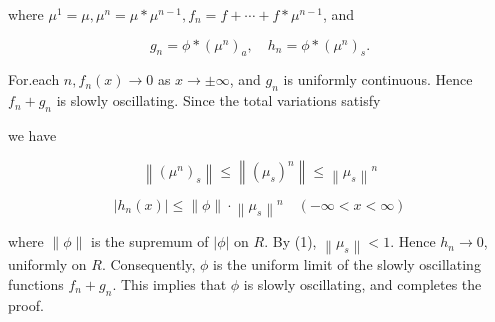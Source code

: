 \documentclass[10pt]{article}
\begin{document}
where $\mu^{1}=\mu, \mu^{n}=\mu * \mu^{n-1}, f_{n}=f+\cdots+f * \mu^{n-1}$, and

$$
g_{n}=\phi *\left(\mu^{n}\right)_{a}, \quad h_{n}=\phi *\left(\mu^{n}\right)_{s} .
$$

For.each $n, f_{n}(x) \rightarrow 0$ as $x \rightarrow \pm \infty$, and $g_{n}$ is uniformly continuous. Hence $f_{n}+g_{n}$ is slowly oscillating. Since the total variations satisfy

we have

$$
\left\|\left(\mu^{n}\right)_{s}\right\| \leq\left\|\left(\mu_{s}\right)^{n}\right\| \leq\left\|\mu_{s}\right\|^{n}
$$

$$
\left|h_{n}(x)\right| \leq\|\phi\| \cdot\left\|\mu_{s}\right\|^{n} \quad(-\infty<x<\infty)
$$

where $\|\phi\|$ is the supremum of $|\phi|$ on $R$. By (1), $\left\|\mu_{s}\right\|<1$. Hence $h_{n} \rightarrow 0$, uniformly on $R$. Consequently, $\phi$ is the uniform limit of the slowly oscillating functions $f_{n}+g_{n}$. This implies that $\phi$ is slowly oscillating, and completes the
proof.
\end{document}
